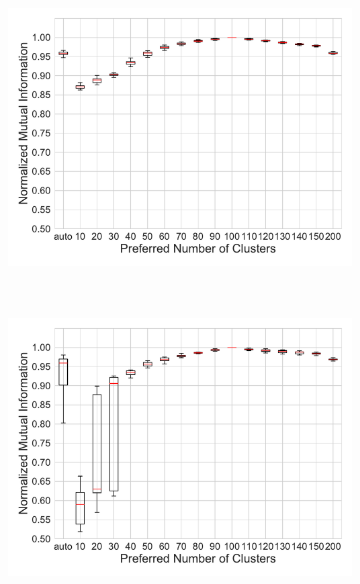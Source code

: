 \documentclass[varwidth, border=0pt]{standalone}
\begin{document}
	
\begin{figure}[H]
	\centering
	\begin{subfigure}{0.5\linewidth}
		\includegraphics[width=\linewidth]{../../graphics/preferred_number_of_modules_nmi_us}
	\end{subfigure}~%
	\begin{subfigure}{0.5\linewidth}
		\includegraphics[width=\linewidth]{../../graphics/preferred_number_of_modules_nmi_de}
	\end{subfigure}
	\begin{subfigure}{0.5\linewidth}

\end{subfigure}
\end{figure}
\end{document}
